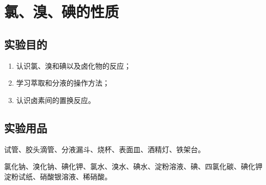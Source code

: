 \section{氯、溴、碘的性质}
\subsection*{实验目的}
\begin{enumerate}[1.]
  \item 认识氯、溴和碘以及卤化物的反应；
  \item 学习萃取和分液的操作方法；
  \item 认识卤素间的置换反应。
\end{enumerate}
\subsection*{实验用品}
试管、胶头滴管、分液漏斗、烧杯、表面皿、酒精灯、铁架台。

氯化钠、溴化钠、碘化钾、氯水、溴水、碘水、淀粉溶液、碘、四氯化碳、碘化钾淀粉试纸、硝酸银溶液、稀硝酸。
